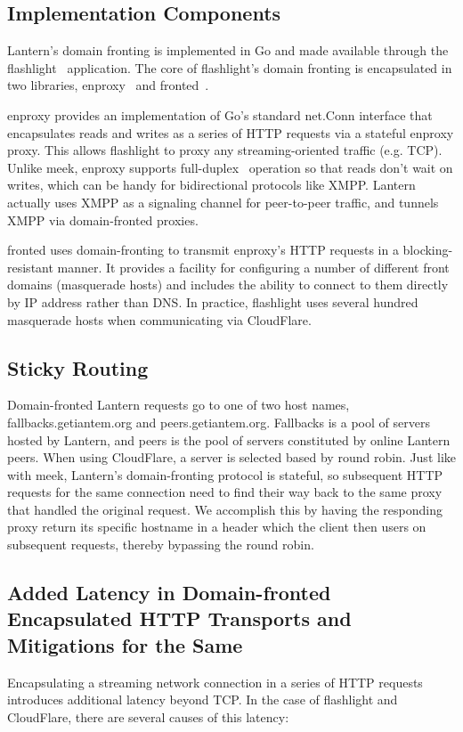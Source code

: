 \documentclass{sig-alternate}
\begin{document}
\subsection{Implementation Components}
Lantern's domain fronting is implemented in Go and made available through
the flashlight~\cite{flashlight} application.
The core of flashlight's domain fronting is encapsulated in two libraries,
enproxy~\cite{enproxy} and fronted~\cite{fronted}.

enproxy provides an implementation of Go's standard net.Conn interface that
encapsulates reads and writes as a series of HTTP requests via a stateful
enproxy proxy.  This allows flashlight to proxy any streaming-oriented
traffic (e.g. TCP).  Unlike meek, enproxy supports full-duplex~\cite{beating-gfw-with-go} operation
so that reads don't wait on writes, which can be handy for bidirectional
protocols like XMPP.  Lantern actually uses XMPP as a signaling channel for
peer-to-peer traffic, and tunnels XMPP via domain-fronted proxies.

fronted uses domain-fronting to transmit enproxy's HTTP requests in a
blocking-resistant manner. It provides a facility for configuring a number
of different front domains (masquerade hosts) and includes the ability to
connect to them directly by IP address rather than DNS. In practice,
flashlight uses several hundred masquerade hosts when communicating via
CloudFlare.

\subsection{Sticky Routing}
Domain-fronted Lantern requests go to one of two host names,
fallbacks.getiantem.org and peers.getiantem.org.  Fallbacks is a pool of
servers hosted by Lantern, and peers is the pool of servers constituted by
online Lantern peers.  When using CloudFlare, a server is selected based by
round robin.  Just like with meek, Lantern's domain-fronting protocol is
stateful, so subsequent HTTP requests for the same connection need to find
their way back to the same proxy that handled the original request.  We
accomplish this by having the responding proxy return its specific hostname
in a header which the client then users on subsequent requests, thereby
bypassing the round robin.

\subsection{Added Latency in Domain-fronted Encapsulated HTTP Transports and
Mitigations for the Same}
Encapsulating a streaming network connection in a series of HTTP requests
introduces additional latency beyond TCP. In the case of flashlight and
CloudFlare, there are several causes of this latency:
\end{document}
